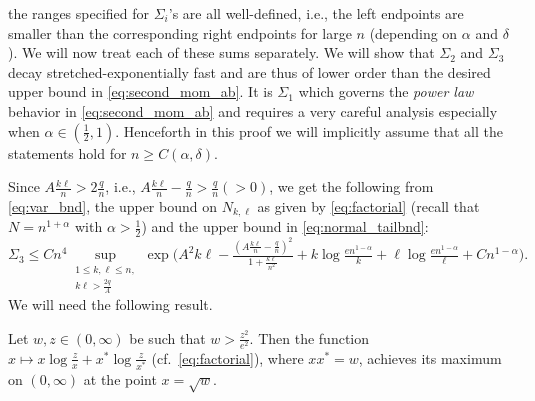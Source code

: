\documentclass[11pt,reqno,letterpaper]{amsart}
\numberwithin{equation}{section}
\theoremstyle{plain}
\begin{document}
the ranges specified for $\Sigma_i$'s are all well-defined, i.e., the left 
endpoints are smaller than the corresponding right endpoints for large $n$ 
(depending on $\alpha$ and $\delta$). We will now treat each of these sums separately. We will show that 
$\Sigma_2$ and $\Sigma_3$ decay stretched-exponentially fast and are thus of lower 
order than the desired upper bound in \eqref{eq:second_mom_ab}. It is $\Sigma_1$ which 
governs the {\em power law} behavior in \eqref{eq:second_mom_ab} and requires a very 
careful analysis especially when $\alpha \in (\frac 12, 1)$. Henceforth in this proof 
we will implicitly assume that all the statements hold for $n \ge C(\alpha, \delta)$. 

\smallskip

 Since $A\tfrac{k\ell}n > 2\frac{q}n$, i.e., 
$A\tfrac{k\ell}n - \frac{q}n > \frac{q}n (> 0)$, we get the following from 
\eqref{eq:var_bnd}, the upper bound on $N_{k, \ell}$ as given by 
\eqref{eq:factorial} (recall that $N = n^{1 + \alpha}$ with $\alpha > \frac12$) 
and the upper bound in \eqref{eq:normal_tailbnd}:
\begin{equation}\label{eq:Sigma3bnd1}
 \Sigma_3 \le C n^4 \sup_{\substack{1 \le k, \ell \le n,\\ k\ell > \frac{2q}A}}\exp\big(A^2k\ell - \tfrac{(A\frac{k\ell}{n} - \tfrac qn)^2}{1 + \frac{k\ell}{n^2}} + k\log \tfrac{en^{1 - \alpha}}{k}  + \ell\log \tfrac{en^{1 - \alpha}}{\ell} + C n^{1 - \alpha}\big).
\end{equation}
We will need the following result.

\vspace{0.3cm}

Let $w, z \in (0, \infty)$ be such that $w > \tfrac{z^2}{e^2}$. Then the function $x \mapsto x \log \tfrac zx + x^\ast \log \tfrac {z}
{x^\ast}$ (cf.~\eqref{eq:factorial}), where $x x^\ast = w$, achieves its maximum on $(0, \infty)$ at the point $x = \sqrt{w}$.

\vspace{0.2cm}
\end{document}

